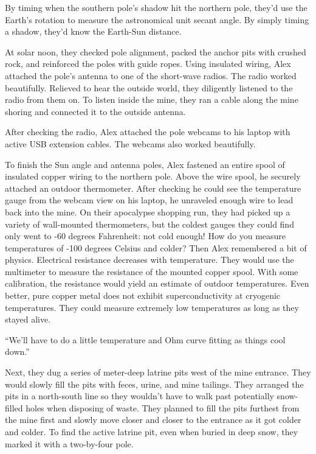 By timing when the southern pole's shadow hit the northern pole, they'd
use the Earth's rotation to measure the astronomical unit secant angle.
By simply timing a shadow, they'd know the Earth-Sun distance.

At solar noon, they checked pole alignment, packed the anchor pits with
crushed rock, and reinforced the poles with guide ropes. Using insulated
wiring, Alex attached the pole's antenna to one of the short-wave
radios. The radio worked beautifully. Relieved to hear the outside
world, they diligently listened to the radio from them on. To listen
inside the mine, they ran a cable along the mine shoring and connected
it to the outside antenna.

After checking the radio, Alex attached the pole webcams to his laptop
with active USB extension cables. The webcams also worked beautifully.

To finish the Sun angle and antenna poles, Alex fastened an entire spool
of insulated copper wiring to the northern pole. Above the wire spool,
he securely attached an outdoor thermometer. After checking he could see
the temperature gauge from the webcam view on his laptop, he unraveled
enough wire to lead back into the mine. On their apocalypse shopping
run, they had picked up a variety of wall-mounted thermometers, but the
coldest gauges they could find only went to -60 degrees Fahrenheit: not
cold enough! How do you measure temperatures of -100 degrees Celsius and
colder? Then Alex remembered a bit of physics. Electrical resistance
decreases with temperature. They would use the multimeter to measure the
resistance of the mounted copper spool. With some calibration, the
resistance would yield an estimate of outdoor temperatures. Even better,
pure copper metal does not exhibit superconductivity at cryogenic
temperatures. They could measure extremely low temperatures as long as
they stayed alive.

``We'll have to do a little temperature and Ohm curve fitting as things
cool down.''

Next, they dug a series of meter-deep latrine pits west of the mine
entrance. They would slowly fill the pits with feces, urine, and mine
tailings. They arranged the pits in a north-south line so they wouldn't
have to walk past potentially snow-filled holes when disposing of waste.
They planned to fill the pits furthest from the mine first and slowly
move closer and closer to the entrance as it got colder and colder. To
find the active latrine pit, even when buried in deep snow, they marked
it with a two-by-four pole.

